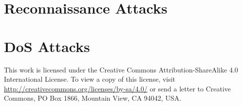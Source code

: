 \documentclass[10pt,a4paper]{article}
\begin{document}
\section{Reconnaissance Attacks}
%



\section{DoS Attacks}



\vspace*{\fill}
\centering
\tiny{This work is licensed under the Creative Commons Attribution-ShareAlike 4.0 International License. To view a copy of this license, visit \href{http://creativecommons.org/licenses/by-sa/4.0/}{http://creativecommons.org/licenses/by-sa/4.0/} or send a letter to Creative Commons, PO Box 1866, Mountain View, CA 94042, USA.}
\end{document}
